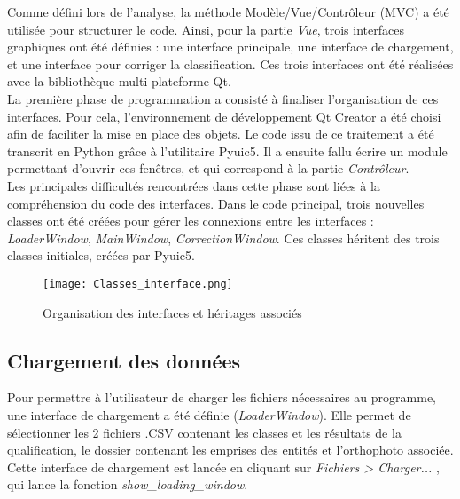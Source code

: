 Comme défini lors de l'analyse, la méthode Modèle/Vue/Contrôleur (MVC) a été utilisée pour structurer le code. Ainsi, pour la partie \textit{Vue}, trois interfaces graphiques ont été définies : une interface principale, une interface de chargement, et une interface pour corriger la classification. Ces trois interfaces ont été réalisées avec la bibliothèque multi-plateforme Qt.\\

La première phase de programmation a consisté à finaliser l'organisation de ces interfaces. Pour cela, l'environnement de développement Qt Creator a été choisi afin de faciliter la mise en place des objets. Le code issu de ce traitement a été transcrit en Python grâce à l'utilitaire Pyuic5. Il a ensuite fallu écrire un module permettant d'ouvrir ces fenêtres, et qui correspond à la partie \textit{Contrôleur}. \\

Les principales difficultés rencontrées dans cette phase sont liées à la compréhension du code des interfaces. Dans le code principal, trois nouvelles classes ont été créées pour gérer les connexions entre les interfaces : \textit{LoaderWindow}, \textit{MainWindow}, \textit{CorrectionWindow}. Ces classes héritent des trois classes initiales, créées par Pyuic5.

\begin{figure}[!h]
	\begin{center}
		\texttt{[image: Classes\_interface.png]}  
		\caption[Organisation des interfaces et héritages associés]{Organisation des interfaces et héritages associés}
		\label{fig:classeinterface}
	\end{center}
\end{figure}

\subsection{Chargement des données}

Pour permettre à l'utilisateur de charger les fichiers nécessaires au programme, une interface de chargement a été définie (\textit{LoaderWindow}). Elle permet de  sélectionner les 2 fichiers .CSV contenant les classes et les résultats de la qualification, le dossier contenant les emprises des entités et l'orthophoto associée. Cette interface de chargement est lancée en cliquant sur \textit{Fichiers > Charger...} , qui lance la fonction \textit{show\_loading\_window}.\\

